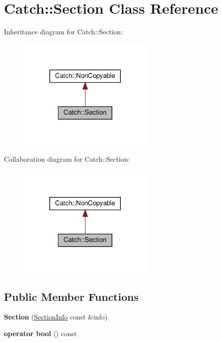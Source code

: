 \hypertarget{classCatch_1_1Section}{}\section{Catch\+::Section Class Reference}
\label{classCatch_1_1Section}


Inheritance diagram for Catch\+::Section\+:\nopagebreak
\begin{figure}[H]
\begin{center}
\leavevmode
\includegraphics[width=188pt]{classCatch_1_1Section__inherit__graph}
\end{center}
\end{figure}


Collaboration diagram for Catch\+::Section\+:\nopagebreak
\begin{figure}[H]
\begin{center}
\leavevmode
\includegraphics[width=188pt]{classCatch_1_1Section__coll__graph}
\end{center}
\end{figure}
\subsection*{Public Member Functions}
\begin{DoxyCompactItemize}
\item 
\mbox{\label{classCatch_1_1Section_a68fd4e51e8981aaa7ddb00d8a6abd099}} 
{\bfseries Section} (\mbox{\hyperlink{structCatch_1_1SectionInfo}{Section\+Info}} const \&info)
\item 
\mbox{\label{classCatch_1_1Section_a0632b804dcea1417a2970620a9742eb3}} 
{\bfseries operator bool} () const
\end{DoxyCompactItemize}


